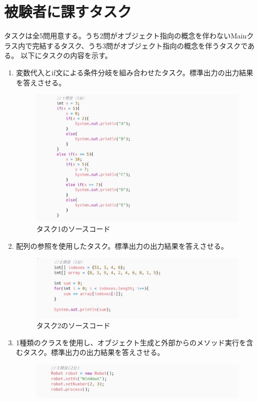 \documentclass[paper=a4paper,fontsize=11pt]{jlreq}
\begin{document}
  \section{被験者に課すタスク}
    タスクは全5問用意する。うち2問がオブジェクト指向の概念を伴わないMainクラス内で完結するタスク、うち3問がオブジェクト指向の概念を伴うタスクである。
    以下にタスクの内容を示す。\\
    \begin{enumerate}[label=タスク\arabic*:]
      \item 変数代入とif文による条件分岐を組み合わせたタスク。標準出力の出力結果を答えさせる。
      \begin{figure}[h]
        \centering
        \includegraphics[height=0.5\linewidth]{プログラム画像_タスク1.jpg}
        \caption{タスク1のソースコード}
      \end{figure}
      \FloatBarrier
      \item 配列の参照を使用したタスク。標準出力の出力結果を答えさせる。
      \begin{figure}[h]
        \centering
        \includegraphics[height=0.25\linewidth]{プログラム画像_タスク2.jpg}
        \caption{タスク2のソースコード}
      \end{figure}
      \FloatBarrier
      \item 1種類のクラスを使用し、オブジェクト生成と外部からのメソッド実行を含むタスク。標準出力の出力結果を答えさせる。
      \begin{figure}[h]
        \centering
        \includegraphics[height=0.2\linewidth]{プログラム画像_タスク3.jpg}

\end{figure}
\end{enumerate}
\end{document}
